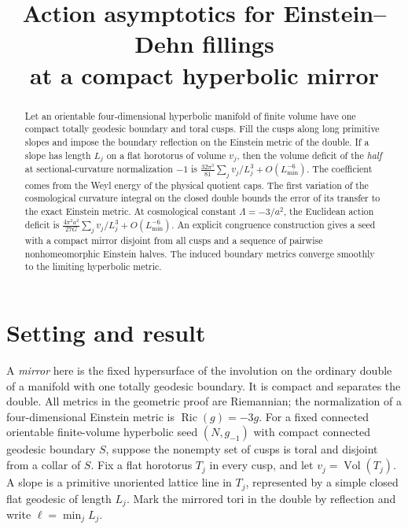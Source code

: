 \documentclass[11pt]{article}
\title{Action asymptotics for Einstein--Dehn fillings\texorpdfstring{\\}{} at a compact hyperbolic mirror}
\author{}
\date{}
\theoremstyle{remark}
\newcommand{\Vol}{\operatorname{Vol}}
\newcommand{\Ric}{\operatorname{Ric}}
\begin{document}
\maketitle
\begin{abstract}
Let an orientable four-dimensional hyperbolic manifold of finite volume have one compact totally geodesic boundary and toral cusps. Fill the cusps along long primitive slopes and impose the boundary reflection on the Einstein metric of the double. If a slope has length \(L_j\) on a flat horotorus of volume \(v_j\), then the volume deficit of the \emph{half} at sectional-curvature normalization \(-1\) is
\(\frac{32\pi^3}{81}\sum_j v_j/L_j^3+O(L_{\min}^{-6})\).
The coefficient comes from the Weyl energy of the physical quotient caps. The first variation of the cosmological curvature integral on the closed double bounds the error of its transfer to the exact Einstein metric. At cosmological constant \(\Lambda=-3/a^2\), the Euclidean action deficit is
\(\frac{4\pi^2a^2}{27G}\sum_j v_j/L_j^3+O(L_{\min}^{-6})\).
An explicit congruence construction gives a seed with a compact mirror disjoint from all cusps and a sequence of pairwise nonhomeomorphic Einstein halves. The induced boundary metrics converge smoothly to the limiting hyperbolic metric.
\end{abstract}

\section{Setting and result}

A \emph{mirror} here is the fixed hypersurface of the involution on the ordinary double of a manifold with one totally geodesic boundary. It is compact and separates the double. All metrics in the geometric proof are Riemannian; the normalization of a four-dimensional Einstein metric is \(\Ric(g)=-3g\). For a fixed connected orientable finite-volume hyperbolic seed \((N,g_{-1})\) with compact connected geodesic boundary \(S\), suppose the nonempty set of cusps is toral and disjoint from a collar of \(S\). Fix a flat horotorus \(T_j\) in every cusp, and let \(v_j=\Vol(T_j)\). A slope is a primitive unoriented lattice line in \(T_j\), represented by a simple closed flat geodesic of length \(L_j\). Mark the mirrored tori in the double by reflection and write \(\ell=\min_j L_j\).
\end{document}
